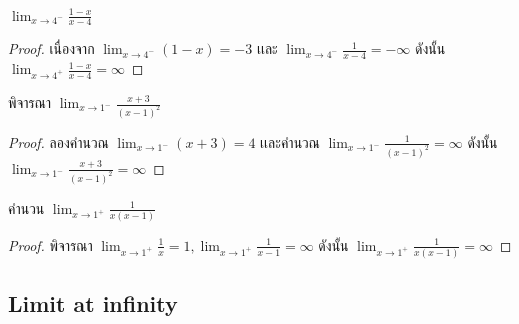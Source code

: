 \documentclass[a4paper,12pt]{scrartcl}
\begin{document}
\begin{example}
	$\lim_{x \to 4^-}\frac{1-x}{x-4}$
\end{example}
\begin{proof}
	เนื่องจาก $\lim_{x \to 4^-} (1-x) = -3$ เเละ $\lim_{x \to 4^-} \frac{1}{x-4} =- \infty$ ดังนั้น $\lim_{x \to 4^+} \frac{1-x}{x-4} =  \infty$
\end{proof}
\begin{example}
	พิจารณา $\lim_{x \to 1^-} \frac{x+3}{(x-1)^2}$
\end{example}
\begin{proof}
	ลองคำนวณ $\lim_{x \to 1^-} (x+3) =4$ เเละคำนวณ $\lim_{x \to 1^-} \frac{1}{(x-1)^2} = \infty$ ดังนั้น $\lim_{x \to 1^- } \frac{x+3}{(x-1)^2} = \infty$
\end{proof}

\begin{example}
	คำนวน $\lim_{x \to 1^+} \frac{1}{x(x-1)}$
\end{example}
\begin{proof}
	พิจารณา $\lim_{x \to 1^+} \frac{1}{x} =1, \lim_{x \to 1^+} \frac{1}{x-1}=\infty$ ดังนั้น  $\lim_{x \to 1^+} \frac{1}{x(x-1)} = \infty$
\end{proof}
\subsection{Limit at infinity}
\end{document}
